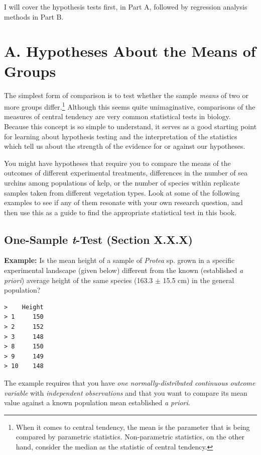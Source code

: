 \documentclass[
  letterpaper,
]{book}
\begin{document}
I will cover the hypothesis tests first, in Part A, followed by
regression analysis methods in Part B.

\section{A. Hypotheses About the Means of
Groups}\label{a.-hypotheses-about-the-means-of-groups}

The simplest form of comparison is to test whether the sample
\emph{means} of two or more groups differ.\footnote{When it comes to
  central tendency, the mean is the parameter that is being compared by
  parametric statistics. Non-parametric statistics, on the other hand,
  consider the median as the statistic of central tendency.} Although
this seems quite unimaginative, comparisons of the measures of central
tendency are very common statistical tests in biology. Because this
concept is so simple to understand, it serves as a good starting point
for learning about hypothesis testing and the interpretation of the
statistics which tell us about the strength of the evidence for or
against our hypotheses.

You might have hypotheses that require you to compare the means of the
outcomes of different experimental treatments, differences in the number
of sea urchins among populations of kelp, or the number of species
within replicate samples taken from different vegetation types. Look at
some of the following examples to see if any of them resonate with your
own research question, and then use this as a guide to find the
appropriate statistical test in this book.

\subsection{\texorpdfstring{One-Sample \emph{t}-Test (Section
X.X.X)}{One-Sample t-Test (Section X.X.X)}}\label{one-sample-t-test-section-x.x.x}

\textbf{Example:} Is the mean height of a sample of \emph{Protea} sp.
grown in a specific experimental landscape (given below) different from
the known (established \emph{a priori}) average height of the same
species (163.3 \(\pm\) 15.5 cm) in the general population?

\begin{verbatim}
>    Height
> 1     150
> 2     152
> 3     148
> 8     150
> 9     149
> 10    148
\end{verbatim}

The example requires that you have \emph{one normally-distributed
continuous outcome variable} with \emph{independent observations} and
that you want to compare its mean value against a known population mean
established \emph{a priori}.
\end{document}
